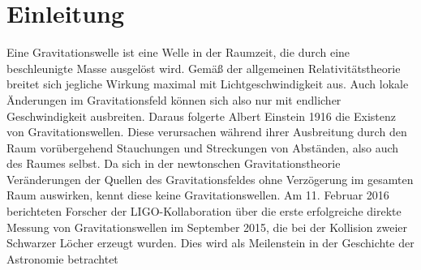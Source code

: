 
\chapter{Einleitung}

Eine Gravitationswelle ist eine Welle in der Raumzeit, die durch eine beschleunigte Masse ausgelöst wird. Gemäß der allgemeinen Relativitätstheorie breitet sich jegliche Wirkung maximal mit Lichtgeschwindigkeit aus. Auch lokale Änderungen im Gravitationsfeld können sich also nur mit endlicher Geschwindigkeit ausbreiten. Daraus folgerte Albert Einstein 1916 die Existenz von Gravitationswellen. Diese verursachen während ihrer Ausbreitung durch den Raum vorübergehend Stauchungen und Streckungen von Abständen, also auch des Raumes selbst.
Da sich in der newtonschen Gravitationstheorie Veränderungen der Quellen des Gravitationsfeldes ohne Verzögerung im gesamten Raum auswirken, kennt diese keine Gravitationswellen.
Am 11. Februar 2016 berichteten Forscher der LIGO-Kollaboration über die erste erfolgreiche direkte Messung von Gravitationswellen im September 2015, die bei der Kollision zweier Schwarzer Löcher erzeugt wurden. Dies wird als Meilenstein in der Geschichte der Astronomie betrachtet


